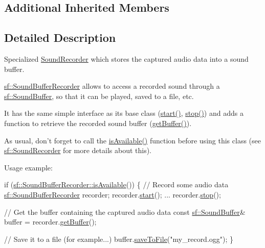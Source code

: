 \subsection*{Additional Inherited Members}


\subsection{Detailed Description}
Specialized \hyperlink{classsf_1_1_sound_recorder}{Sound\-Recorder} which stores the captured audio data into a sound buffer. 

\hyperlink{classsf_1_1_sound_buffer_recorder}{sf\-::\-Sound\-Buffer\-Recorder} allows to access a recorded sound through a \hyperlink{classsf_1_1_sound_buffer}{sf\-::\-Sound\-Buffer}, so that it can be played, saved to a file, etc.

It has the same simple interface as its base class (\hyperlink{classsf_1_1_sound_recorder_a715f0fd2f228c83d79aaedca562ae51f}{start()}, \hyperlink{classsf_1_1_sound_recorder_a8d9c8346aa9aa409cfed4a1101159c4c}{stop()}) and adds a function to retrieve the recorded sound buffer (\hyperlink{classsf_1_1_sound_buffer_recorder_a84fd636ad22f434bafe2a7c15a8e5107}{get\-Buffer()}).

As usual, don't forget to call the \hyperlink{classsf_1_1_sound_recorder_aab2bd0fee9e48d6cfd449b1cb078ce5a}{is\-Available()} function before using this class (see \hyperlink{classsf_1_1_sound_recorder}{sf\-::\-Sound\-Recorder} for more details about this).

Usage example\-: 
\begin{DoxyCode}
\textcolor{keywordflow}{if} (\hyperlink{classsf_1_1_sound_recorder_aab2bd0fee9e48d6cfd449b1cb078ce5a}{sf::SoundBufferRecorder::isAvailable}())
\{
    \textcolor{comment}{// Record some audio data}
    \hyperlink{classsf_1_1_sound_buffer_recorder}{sf::SoundBufferRecorder} recorder;
    recorder.\hyperlink{classsf_1_1_sound_recorder_a715f0fd2f228c83d79aaedca562ae51f}{start}();
    ...
    recorder.\hyperlink{classsf_1_1_sound_recorder_a8d9c8346aa9aa409cfed4a1101159c4c}{stop}();

    \textcolor{comment}{// Get the buffer containing the captured audio data}
    \textcolor{keyword}{const} \hyperlink{classsf_1_1_sound_buffer}{sf::SoundBuffer}& buffer = recorder.\hyperlink{classsf_1_1_sound_buffer_recorder_a84fd636ad22f434bafe2a7c15a8e5107}{getBuffer}();

    \textcolor{comment}{// Save it to a file (for example...)}
    buffer.\hyperlink{classsf_1_1_sound_buffer_ab2083dc1a934c64959d9e3f162328a76}{saveToFile}(\textcolor{stringliteral}{"my\_record.ogg"});
\}
\end{DoxyCode}


